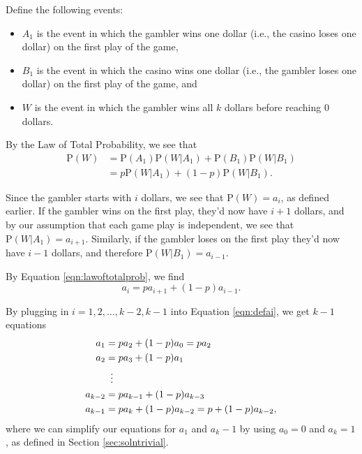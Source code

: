 \documentclass[a4paper,11pt]{article}
\newcommand{\Prob}{\mathrm{P}}
\begin{document}
Define the following events:
\begin{itemize}
\item $A_1$ is the event in which the gambler wins one dollar (i.e., the casino loses one dollar) on the first play of the game,
\item $B_1$ is the event in which the casino wins one dollar (i.e., the gambler loses one dollar) on the first play of the game, and
\item $W$ is the event in which the gambler wins all $k$ dollars before reaching $0$ dollars.
\end{itemize}

By the Law of Total Probability, we see that
\begin{align}
\Prob(W)&=\Prob(A_1)\Prob(W|A_1)+\Prob(B_1)\Prob(W|B_1) \nonumber 
\\
&=p\Prob(W|A_1)+(1-p)\Prob(W|B_1).
\label{eqn:lawoftotalprob}
\end{align}

Since the gambler starts with $i$ dollars, we see that $\Prob(W)=a_i$, as defined earlier. If the gambler wins on the first play, they'd now have $i+1$ dollars, and by our assumption that each game play is independent, we see that $\Prob(W|A_1)=a_{i+1}$. Similarly, if the gambler loses on the first play they'd now have $i-1$ dollars, and therefore $\Prob(W|B_1)=a_{i-1}$.

By Equation \ref{eqn:lawoftotalprob}, we find
\begin{equation}
a_i=p a_{i+1} + (1-p) a_{i-1}.
\label{eqn:defai}
\end{equation}

By plugging in $i=1,2,\ldots,k-2,k-1$ into Equation \ref{eqn:defai}, we get $k-1$ equations
\begin{align}
a_1 &= p a_2 + (1-p) a_0 = p a_2 \nonumber
\\
a_2 &= p a_3 + (1-p) a_1 \nonumber
\\
& \vdotswithin{=} \nonumber
\\
a_{k-2} &= p a_{k-1} + (1-p) a_{k-3} \nonumber
\\
a_{k-1} &= p a_{k} + (1-p) a_{k-2} = p + (1-p) a_{k-2},
\label{eqn:exampleai}
\end{align}
where we can simplify our equations for $a_1$ and $a_k-1$ by using $a_0=0$ and $a_k=1$, as defined in Section \ref{sec:solntrivial}.
\end{document}
